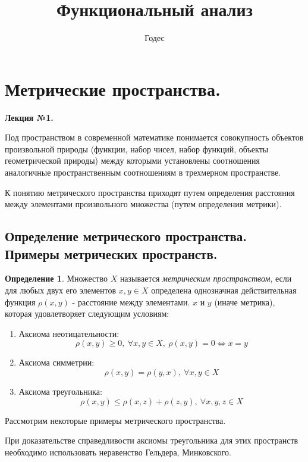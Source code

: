 \documentclass[14pt,a4paper]{extarticle}
\title{\textbf{Функциональный анализ}}
\author{Годес}
\date{}
\theoremstyle{definition}
\newtheorem{definition}{Определение}[section]
\theoremstyle{remark}
\renewcommand{\[}{\begin{dmath*}[compact]}
\renewcommand{\]}{\end{dmath*}}
\newcommand{\be}{\begin{enumerate}}
\newcommand{\ee}{\end{enumerate}}
\newcommand{\sep}{ , \ \allowbreak }
\begin{document}
\sloppy
\maketitle

\tableofcontents

\section{Метрические пространства.} \label{sec:mp}

\textbf{Лекция №1.}

Под пространством в современной математике понимается совокупность объектов
произвольной природы (функции, набор чисел, набор функций, объекты
геометрической природы) между которыми установлены соотношения аналогичные
пространственным соотношениям в трехмерном пространстве.

К понятию метрического пространства приходят путем определения расстояния между
элементами произвольного множества (путем определения метрики).

\subsection{Определение метрического пространства.
Примеры метрических пространств.}

\begin{definition}
  Множество $X$ называется \textit{метрическим пространством},
  если для любых двух его элементов $x, y \in X$
  определена однозначная действительная функция
  $\rho(x, y)$ - расстояние между элементами.
  $x$ и $y$ (иначе метрика), которая удовлетворяет следующим условиям:

  \be
    \item Аксиома неотицательности:
    \[ \rho(x, y) \geq 0 \sep {\forall x, y \in X} \sep
    {\rho(x, y) = 0} \Leftrightarrow {x = y} \]
    \item Аксиома симметрии:
    \[\rho(x, y) = \rho(y, x) \sep {\forall x, y \in X}\]
    \item Аксиома треугольника:
    \[\rho(x, y) \leq \rho(x, z) + \rho(z, y) \sep {\forall x, y, z \in X}\]
  \ee
\end{definition}

Рассмотрим некоторые примеры метрического пространства.

При доказательстве справедливости аксиомы треугольника для этих пространств
необходимо использовать неравенство Гельдера, Минковского.
\end{document}
